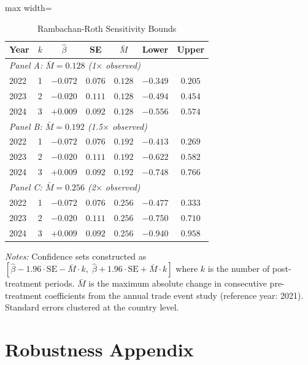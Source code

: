 \documentclass[12pt]{article}
\begin{document}
\begin{table}[htbp]
\centering
\caption{Rambachan-Roth Sensitivity Bounds}
\label{tab:rr_bounds}
\begin{adjustbox}{max width=\textwidth}
\begin{tabular}{lcccccc}
\hline\hline
Year & $k$ & $\hat{\beta}$ & SE & $\bar{M}$ & Lower & Upper \\
\hline
\multicolumn{7}{l}{\textit{Panel A: $\bar{M} = 0.128$ (1$\times$ observed)}} \\
2022 & 1 & $-0.072$ & $0.076$ & $0.128$ & $-0.349$ & $0.205$ \\
2023 & 2 & $-0.020$ & $0.111$ & $0.128$ & $-0.494$ & $0.454$ \\
2024 & 3 & $+0.009$ & $0.092$ & $0.128$ & $-0.556$ & $0.574$ \\
\hline
\multicolumn{7}{l}{\textit{Panel B: $\bar{M} = 0.192$ (1.5$\times$ observed)}} \\
2022 & 1 & $-0.072$ & $0.076$ & $0.192$ & $-0.413$ & $0.269$ \\
2023 & 2 & $-0.020$ & $0.111$ & $0.192$ & $-0.622$ & $0.582$ \\
2024 & 3 & $+0.009$ & $0.092$ & $0.192$ & $-0.748$ & $0.766$ \\
\hline
\multicolumn{7}{l}{\textit{Panel C: $\bar{M} = 0.256$ (2$\times$ observed)}} \\
2022 & 1 & $-0.072$ & $0.076$ & $0.256$ & $-0.477$ & $0.333$ \\
2023 & 2 & $-0.020$ & $0.111$ & $0.256$ & $-0.750$ & $0.710$ \\
2024 & 3 & $+0.009$ & $0.092$ & $0.256$ & $-0.940$ & $0.958$ \\
\hline\hline
\end{tabular}
\end{adjustbox}
\begin{minipage}{0.95\textwidth}
\vspace{0.3em}
\textit{Notes:} Confidence sets constructed as $[\hat{\beta} - 1.96 \cdot \text{SE} - \bar{M} \cdot k, \; \hat{\beta} + 1.96 \cdot \text{SE} + \bar{M} \cdot k]$ where $k$ is the number of post-treatment periods. $\bar{M}$ is the maximum absolute change in consecutive pre-treatment coefficients from the annual trade event study (reference year: 2021). Standard errors clustered at the country level.
\end{minipage}
\end{table}


\section{Robustness Appendix}
\label{app:robustness}
\end{document}
